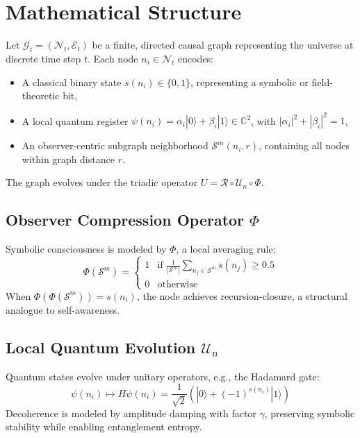\documentclass[11pt]{article}
\begin{document}
\section{Mathematical Structure}
Let \( \mathcal{G}_t = (\mathcal{N}_t, \mathcal{E}_t) \) be a finite, directed causal graph representing the universe at discrete time step \( t \). Each node \( n_i \in \mathcal{N}_t \) encodes:
\begin{itemize}
    \item A classical binary state \( s(n_i) \in \{0, 1\} \), representing a symbolic or field-theoretic bit,
    \item A local quantum register \( \psi(n_i) = \alpha_i|0\rangle + \beta_i|1\rangle \in \mathbb{C}^2 \), with \( |\alpha_i|^2 + |\beta_i|^2 = 1 \),
    \item An observer-centric subgraph neighborhood \( \mathcal{S}^m(n_i, r) \), containing all nodes within graph distance \( r \).
\end{itemize}
The graph evolves under the triadic operator \( U = \mathcal{R} \circ \mathcal{U}_n \circ \Phi \).

\subsection{Observer Compression Operator \( \Phi \)}
Symbolic consciousness is modeled by \( \Phi \), a local averaging rule:
\begin{equation}
    \Phi(\mathcal{S}^m) = \begin{cases} 
        1 & \text{if } \frac{1}{|\mathcal{S}^m|} \sum_{n_j \in \mathcal{S}^m} s(n_j) \geq 0.5 \\ 
        0 & \text{otherwise} 
    \end{cases}
\end{equation}
When \( \Phi(\Phi(\mathcal{S}^m)) = s(n_i) \), the node achieves recursion-closure, a structural analogue to self-awareness.

\subsection{Local Quantum Evolution \( \mathcal{U}_n \)}
Quantum states evolve under unitary operators, e.g., the Hadamard gate:
\begin{equation}
    \psi(n_i) \mapsto H \psi(n_i) = \frac{1}{\sqrt{2}}(|0\rangle + (-1)^{s(n_i)}|1\rangle)
\end{equation}
Decoherence is modeled by amplitude damping with factor \( \gamma \), preserving symbolic stability while enabling entanglement entropy.
\end{document}
